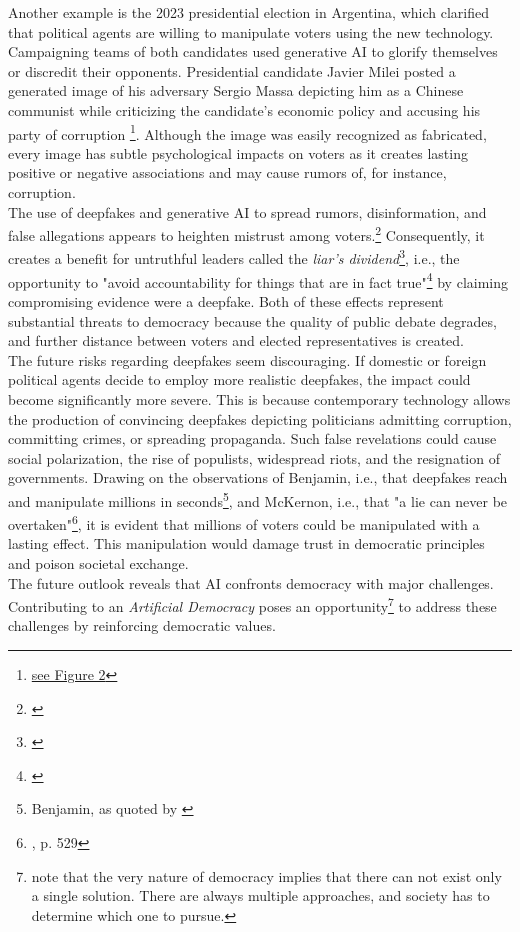 \documentclass[wide]{adonis}
\begin{document}
        Another example is the 2023 presidential election in Argentina, which clarified that political agents are willing to manipulate voters using the new technology. Campaigning teams of both candidates used generative AI to glorify themselves or discredit their opponents. Presidential candidate Javier Milei posted a generated image of his adversary Sergio Massa depicting him as a Chinese communist while criticizing the candidate's economic policy and accusing his party of corruption \footnote{\hyperref[fig2]{see Figure 2}}. Although the image was easily recognized as fabricated, every image has subtle psychological impacts on voters as it creates lasting positive or negative associations and may cause rumors of, for instance, corruption. \\
        The use of deepfakes and generative AI to spread rumors, disinformation, and false allegations appears to heighten mistrust among voters.\footnote{\cite{brennan-deepfake}} Consequently, it creates a benefit for untruthful leaders called the \textit{liar's dividend}\footnote{ \cite{California-law}}, i.e., the opportunity to "avoid accountability for things that are in fact true"\footnote{ \cite{California-law}} by claiming compromising evidence were a deepfake. 
        Both of these effects represent substantial threats to democracy because the quality of public debate degrades, and further distance between voters and elected representatives is created.\\
        The future risks regarding deepfakes seem discouraging. If domestic or foreign political agents decide to employ more realistic deepfakes, the impact could become significantly more severe. This is because contemporary technology allows the production of convincing deepfakes depicting politicians admitting corruption, committing crimes, or spreading propaganda. Such false revelations could cause social polarization, the rise of populists, widespread riots, and the resignation of governments.
        Drawing on the observations of Benjamin, i.e., that deepfakes reach and manipulate millions in seconds\footnote{Benjamin, as quoted by \cite{cnn-indonesia}}, and McKernon, i.e., that "a lie can never be overtaken"\footnote{\cite{mckernon1925}, p. 529}, it is evident that millions of voters could be manipulated with a lasting effect. This manipulation would damage trust in democratic principles and poison societal exchange.\\
        The future outlook reveals that AI confronts democracy with major challenges. Contributing to an \textit{Artificial Democracy} poses an opportunity\footnote{note that the very nature of democracy implies that there can not exist only a single solution. There are always multiple approaches, and society has to determine which one to pursue. } to address these challenges by reinforcing democratic values.
\end{document}
